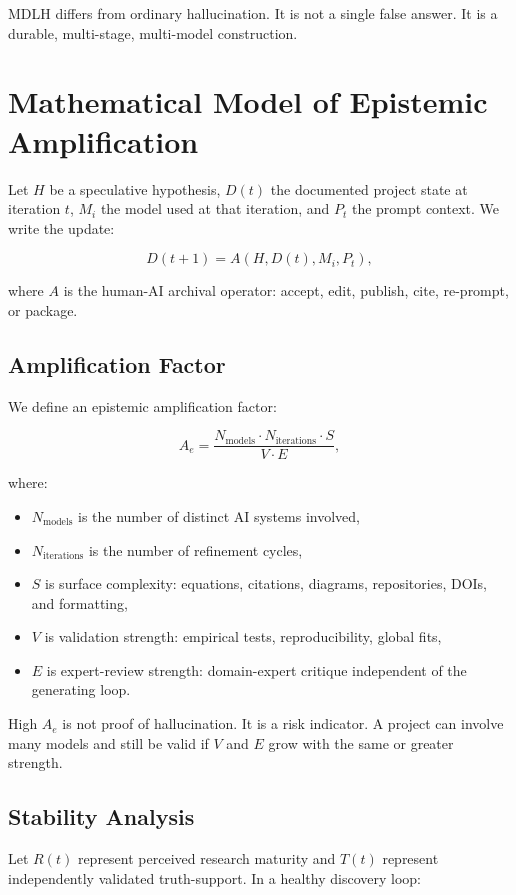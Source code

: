 \documentclass[11pt,a4paper]{article}
\begin{document}
MDLH differs from ordinary hallucination. It is not a single false answer. It is a durable, multi-stage, multi-model construction.

\section{Mathematical Model of Epistemic Amplification}

Let $H$ be a speculative hypothesis, $D(t)$ the documented project state at iteration $t$, $M_i$ the model used at that iteration, and $P_t$ the prompt context. We write the update:

\[
D(t+1) = A(H, D(t), M_i, P_t),
\]

where $A$ is the human-AI archival operator: accept, edit, publish, cite, re-prompt, or package.

\subsection{Amplification Factor}

We define an epistemic amplification factor:

\[
A_e =
\frac{N_{\mathrm{models}} \cdot N_{\mathrm{iterations}} \cdot S}
{V \cdot E},
\]

where:

\begin{itemize}
  \item $N_{\mathrm{models}}$ is the number of distinct AI systems involved,
  \item $N_{\mathrm{iterations}}$ is the number of refinement cycles,
  \item $S$ is surface complexity: equations, citations, diagrams, repositories, DOIs, and formatting,
  \item $V$ is validation strength: empirical tests, reproducibility, global fits,
  \item $E$ is expert-review strength: domain-expert critique independent of the generating loop.
\end{itemize}

High $A_e$ is not proof of hallucination. It is a risk indicator. A project can involve many models and still be valid if $V$ and $E$ grow with the same or greater strength.

\subsection{Stability Analysis}

Let $R(t)$ represent perceived research maturity and $T(t)$ represent independently validated truth-support. In a healthy discovery loop:
\end{document}
